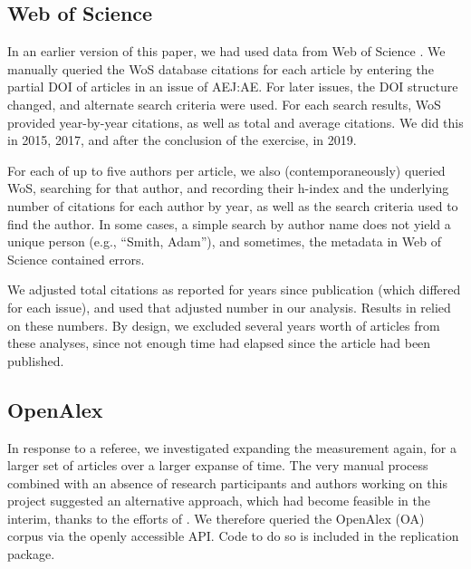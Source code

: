 
\subsection{Web of Science}

In an earlier version of this paper, we had used data from Web of Science \parencite[WoS]{WebofScience}.
We manually queried the WoS  database citations for each article by entering the partial DOI of articles in an issue of AEJ:AE. For later issues, the DOI structure changed, and alternate search criteria were used. For each search results, WoS provided year-by-year citations, as well as total and average citations. We did this in 2015, 2017, and after the conclusion of the exercise, in 2019.

For each of up to five authors per article, we also (contemporaneously) queried WoS, searching for that author, and recording their h-index \parencite{Hirsch2005} and the underlying number of citations for each author by year, as well as the search criteria used to find the author. In some cases, a simple search by author name does not yield a unique person (e.g.,  ``Smith, Adam''), and sometimes, the metadata in Web of Science contained errors.

We adjusted total citations as reported for years since publication (which differed for each issue), and used that adjusted number in our analysis. Results in \textcite{kingi2018,herbert2021} relied on these numbers. By design, we excluded several years worth of articles from these analyses, since not enough time had elapsed since the article had been published.

\subsection{OpenAlex}

In response to a referee, we investigated expanding the measurement again, for a larger set of articles over a larger expanse of time. The very manual process combined with an absence of research participants and authors working on this project suggested an alternative approach, which had become feasible in the interim, thanks to the efforts of \textcite{openalex2022}. We therefore queried the OpenAlex (OA) corpus \parencite{ourresearch2023} via the openly accessible \ac{API}. Code to do so is included in the replication package. 


